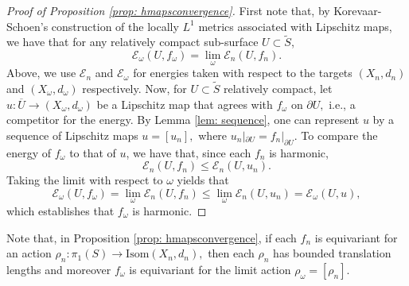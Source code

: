 \documentclass[10pt]{amsart}
\theoremstyle{definition}
\begin{document}
\begin{proof}[Proof of Proposition \ref{prop: hmapsconvergence}]
   First note that, by Korevaar-Schoen's construction of the locally $L^1$ metrics associated with Lipschitz maps, we have that for any relatively compact sub-surface $U\subset \tilde{S}$, $$\mathcal{E}_\omega (U, f_\omega)=\lim_\omega \mathcal{E}_n(U,f_n).$$ Above, we use $\mathcal{E}_n$ and $\mathcal{E}_\omega$ for energies taken with respect to the targets $(X_n,d_n)$ and $(X_\omega, d_\omega)$ respectively. Now, for $U\subset \tilde{S}$ relatively compact, let $u:\overline{U}\to (X_\omega,d_\omega)$ be a Lipschitz map that agrees with $f_\omega$ on $\partial U,$ i.e., a competitor for the energy. By Lemma \ref{lem: sequence}, one can represent $u$ by a sequence of Lipschitz maps $u=[u_n],$ where $u_n|_{\partial U}=f_n|_{\partial U}$. To compare the energy of $f_\omega$ to that of $u$, we have that, since each $f_n$ is harmonic, $$\mathcal{E}_n(U,f_n)\leq \mathcal{E}_n(U,u_n).$$ Taking the limit with respect to $\omega$ yields that $$\mathcal{E}_\omega (U, f_\omega)=\lim_\omega \mathcal{E}_n(U,f_n)\leq \lim_\omega \mathcal{E}_n(U,u_n)=\mathcal{E}_\omega(U,u),$$ which establishes that $f_\omega$ is harmonic.
\end{proof}
Note that, in Proposition \ref{prop: hmapsconvergence}, if each $f_n$ is equivariant for an action $\rho_n: \pi_1(S)\to \textrm{Isom}(X_n,d_n),$ then each $\rho_n$ has bounded translation lengths and moreover $f_\omega$ is equivariant for the limit action $\rho_\omega=[\rho_n].$
\end{document}
